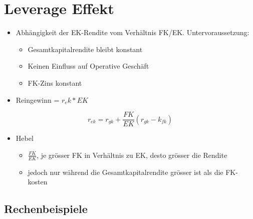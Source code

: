 
\section{Leverage Effekt}

\begin{itemize}
    \item Abhängigkeit der EK-Rendite vom Verhältnis FK/EK. Untervoraussetzung: 
    \begin{itemize}
        \item Gesamtkapitalrendite bleibt konstant
        \item Keinen Einfluss auf Operative Geschäft
        \item FK-Zins konstant
    \end{itemize}
    \item Reingewinn = $ r_ek * EK$
\end{itemize}

\[
    r_{ek} = r_{gk} + \frac{FK}{EK}(r_{gk} - k_{fk})
\]

\begin{itemize}
    \item Hebel
    \begin{itemize}
        \item $\frac{FK}{EK}$, je grösser FK in Verhältnis zu EK, desto grösser die Rendite
        \item jedoch nur während die Gesamtkapitalrendite grösser ist als die FK-kosten
    \end{itemize}
\end{itemize}

\subsection{Rechenbeispiele}

